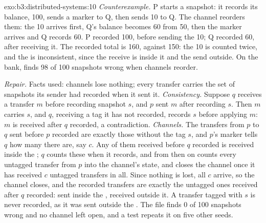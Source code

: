 \begin{solution}{exo:b3:distributed-systems:10}
\emph{Counterexample.} P starts a snapshot: it records its balance, 100, sends a marker to Q, then sends 10 to Q. The channel reorders them: the 10 arrives first, Q's balance becomes 60 from 50, then the marker arrives and Q records 60. P recorded 100, before sending the 10; Q recorded 60, after receiving it. The recorded total is 160, against 150: the 10 is counted twice, and the  is inconsistent, since the receive is inside it and the send outside. On the bank,  finds 98 of 100 snapshots wrong when channels reorder.

\emph{Repair.} Facts used: channels lose nothing; every transfer carries the set of snapshots its sender had recorded when it sent it. \emph{Consistency.} Suppose $q$ receives a transfer $m$ before recording snapshot $s$, and $p$ sent $m$ after recording $s$. Then $m$ carries $s$, and $q$, receiving a tag it has not recorded, records $s$ before applying $m$: $m$ is received after $q$ recorded, a contradiction. \emph{Channels.} The transfers from $p$ to $q$ sent before $p$ recorded are exactly those without the tag $s$, and $p$'s marker tells $q$ how many there are, say $c$. Any of them received before $q$ recorded is received inside the ; $q$ counts these when it records, and from then on counts every untagged transfer from $p$ into the channel's state, and closes the channel once it has received $c$ untagged transfers in all. Since nothing is lost, all $c$ arrive, so the channel closes, and the recorded transfers are exactly the untagged ones received after $q$ recorded: sent inside the , received outside it. A transfer tagged with $s$ is never recorded, as it was sent outside the . The file finds 0 of 100 snapshots wrong and no channel left open, and a test repeats it on five other seeds.
\end{solution}

